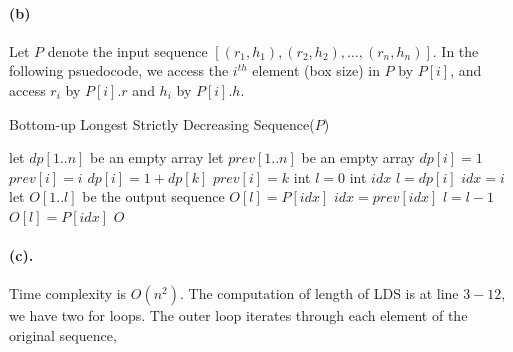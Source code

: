 \documentclass[12pt]{article}
\begin{document}
\paragraph{(b)} Let \(P\) denote the input sequence \([(r_1,h_1), (r_2,h_2), \hdots, (r_n,h_n)]\). In the following psuedocode, we access the \(i^{th}\) element (box size) in \(P\) by \(P[i]\), and access \(r_i\) by \(P[i].r\) and  \(h_i\) by \(P[i].h\).
\begin{algorithm}
     \caption{Bottom-up Longest Strictly Decreasing Sequence(\(P\))}
     \begin{algorithmic}[1]
     \State let \(dp[1..n]\) be an empty array 
     \State let \(prev[1..n]\) be an empty array 
          \State \(dp[i] = 1\)
          \State \(prev[i] = i\)
                    \State \(dp[i] = 1 + dp[k]\)
                    \State \(prev[i] = k\)
               \EndIf
          \EndFor
     \EndFor
     \State int \(l = 0\)
     \State int \(idx\) 
               \State \(l = dp[i]\) 
               \State \(idx = i\) 
          \EndIf
     \EndFor
     \State let \(O[1..l]\) be the output sequence
          \State \(O[l] = P[idx]\)
          \State \(idx = prev[idx]\)
          \State \(l = l - 1\)
     \EndWhile
     \State \(O[l] = P[idx]\)
     \State \Return \(O\)
     \end{algorithmic}
\end{algorithm}

\paragraph{(c).} Time complexity is \(O(n^2)\). The computation of length of LDS is at line \(3-12\), we have two for loops. The outer loop iterates through each element of the original sequence,
\end{document}
